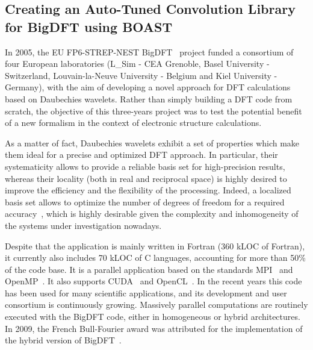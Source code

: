 \documentclass{IEEEtran}
\begin{document}
\subsection{Creating an Auto-Tuned Convolution Library for BigDFT using BOAST}

In 2005, the EU FP6-STREP-NEST BigDFT~\cite{genovese2008daubechies} project
funded a consortium of four European laboratories (L\_Sim - CEA Grenoble, Basel
University - Switzerland, Louvain-la-Neuve University - Belgium and Kiel
University - Germany), with the aim of developing a novel approach for DFT
calculations based on Daubechies wavelets.  Rather than simply building a DFT
code from scratch, the objective of this three-years project was to test the
potential benefit of a new formalism in the context of electronic structure
calculations.

As a matter of fact, Daubechies wavelets exhibit a set of properties which make
them ideal for a precise and optimized DFT approach. In particular, their
systematicity allows to provide a reliable basis set for high-precision results,
whereas their locality (both in real and reciprocal space) is highly desired to
improve the efficiency and the flexibility of the processing. Indeed, a
localized basis set allows to optimize the number of degrees of freedom for a
required accuracy~\cite{genovese2008daubechies}, which is highly desirable given
the complexity and inhomogeneity of the systems under investigation nowadays.

Despite that the application is mainly written in Fortran (360 kLOC of Fortran), it 
currently also includes 70 kLOC of C languages, accounting for
more than 50\% of the code base.  It is a parallel application based on the
standards MPI~\cite{mpi} and OpenMP~\cite{openmp}.  It also supports
CUDA~\cite{cuda} and OpenCL~\cite{opencl}.  In the recent years this code has
been used for many scientific applications, and its development and user
consortium is continuously growing.  Massively parallel computations are
routinely executed with the BigDFT code, either in homogeneous or hybrid
architectures.  In 2009, the French Bull-Fourier award was attributed for the
implementation of the hybrid version of BigDFT~\cite{genovese2009density}.

\end{document}
